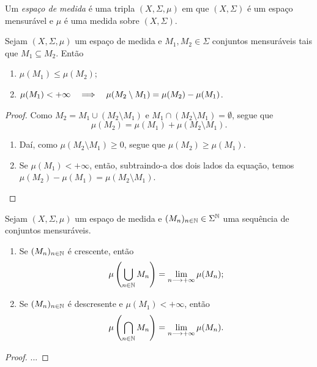 \begin{defi}
	Um \emph{espaço de medida} é uma tripla $(X,\Sigma,\mu)$ em que $(X,\Sigma)$ é um espaço mensurável e $\mu$ é uma medida sobre $(X,\Sigma)$.
\end{defi}

\begin{prop}
Sejam $(X, \Sigma,\mu)$ um espaço de medida e $M_1,M_2 \in \Sigma$ conjuntos mensuráveis tais que $M_1 \subseteq M_2$. Então
	\begin{enumerate}
	\item $\mu(M_1) \leq \mu(M_2)$;
	\item $\mu(M_1) < + \infty \quad \Longrightarrow \quad \mu(M_2 \setminus M_1) = \mu(M_2) - \mu(M_1)$.
	\end{enumerate}
\end{prop}
\begin{proof}
	Como $M_2 = M_1 \cup (M_2 \setminus M_1)$ e $M_1 \cap (M_2 \setminus M_1) = \emptyset$, segue que
	\begin{equation*}
	\mu(M_2)=\mu(M_1)+\mu(M_2 \setminus M_1).
	\end{equation*}
	\begin{enumerate}
	\item Daí, como $\mu(M_2 \setminus M_1) \geq 0$, segue que $\mu(M_2) \geq \mu(M_1)$.
	\item Se $\mu(M_1) < + \infty$, então, subtraindo-a dos dois lados da equação, temos $\mu(M_2)-\mu(M_1)=\mu(M_2 \setminus M_1)$.
	\end{enumerate}
\end{proof}

\begin{prop}
Sejam $(X, \Sigma,\mu)$ um espaço de medida e $(M_n)_{n \in \mathbb{N}} \in \Sigma^{\mathbb{N}}$ uma sequência de conjuntos mensuráveis.
	\begin{enumerate}
	\item Se $(M_n)_{n \in \mathbb{N}}$ é crescente, então
		\begin{equation*}
		\mu \left( \bigcup_{n \in \mathbb{N}} M_n \right) = \lim_{n \longrightarrow +\infty} \mu(M_n);
		\end{equation*}
	\item Se $(M_n)_{n \in \mathbb{N}}$ é descresente e $\mu(M_1) < + \infty$, então
		\begin{equation*}
		\mu \left( \bigcap_{n \in \mathbb{N}} M_n \right) = \lim_{n \longrightarrow +\infty} \mu(M_n).
		\end{equation*}
	\end{enumerate}
\end{prop}
\begin{proof}
	...
\end{proof}


